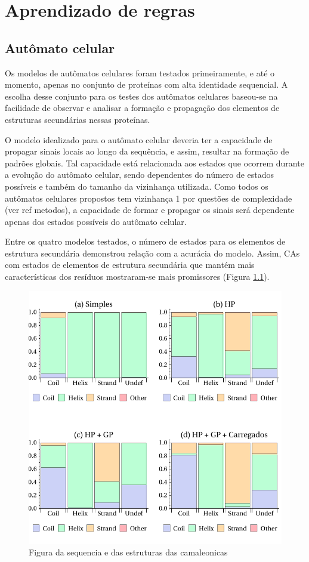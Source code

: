 \chapter{Aprendizado de regras}

\section{Autômato celular}

Os modelos de autômatos celulares foram testados primeiramente, e até o momento, apenas no conjunto de proteínas com alta identidade sequencial. A escolha desse conjunto para os testes dos autômatos celulares baseou-se na facilidade de observar e analisar a formação e propagação dos elementos de estruturas secundárias nessas proteínas.

O modelo idealizado para o autômato celular deveria ter a capacidade de propagar sinais locais ao longo da sequência, e assim, resultar na formação de padrões globais. Tal capacidade está relacionada aos estados que ocorrem durante a evolução do autômato celular, sendo dependentes do número de estados possíveis e também do tamanho da vizinhança utilizada. Como todos os autômatos celulares propostos tem vizinhança 1 por questões de complexidade (ver ref metodos), a capacidade de formar e propagar os sinais será dependente apenas dos estados possíveis do autômato celular.

Entre os quatro modelos testados, o número de estados para os elementos de estrutura secundária demonstrou relação com a acurácia do modelo. Assim, CAs com estados de elementos de estrutura secundária que mantém mais características dos resíduos mostraram-se mais promissores (Figura \ref{fig:ca_errors}).

\begin{figure}
  \centering
  \includegraphics[width=.9\textwidth]{figures/chamel_errors_ca.pdf}
  \caption{Figura da sequencia e das estruturas das camaleonicas}
        \label{fig:ca_errors}
\end{figure}

